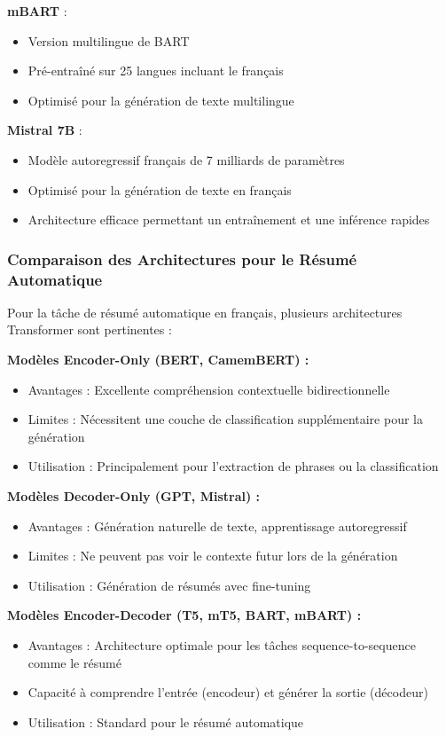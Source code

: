 \textbf{mBART} :
\begin{itemize}
    \item Version multilingue de BART
    \item Pré-entraîné sur 25 langues incluant le français
    \item Optimisé pour la génération de texte multilingue
\end{itemize}

\textbf{Mistral 7B} \cite{jiang2023mistral} :
\begin{itemize}
    \item Modèle autoregressif français de 7 milliards de paramètres
    \item Optimisé pour la génération de texte en français
    \item Architecture efficace permettant un entraînement et une inférence rapides
\end{itemize}

\subsubsection{Comparaison des Architectures pour le Résumé Automatique}

Pour la tâche de résumé automatique en français, plusieurs architectures Transformer sont pertinentes :

\textbf{Modèles Encoder-Only (BERT, CamemBERT) :}
\begin{itemize}
    \item Avantages : Excellente compréhension contextuelle bidirectionnelle
    \item Limites : Nécessitent une couche de classification supplémentaire pour la génération
    \item Utilisation : Principalement pour l'extraction de phrases ou la classification
\end{itemize}

\textbf{Modèles Decoder-Only (GPT, Mistral) :}
\begin{itemize}
    \item Avantages : Génération naturelle de texte, apprentissage autoregressif
    \item Limites : Ne peuvent pas voir le contexte futur lors de la génération
    \item Utilisation : Génération de résumés avec fine-tuning
\end{itemize}

\textbf{Modèles Encoder-Decoder (T5, mT5, BART, mBART) :}
\begin{itemize}
    \item Avantages : Architecture optimale pour les tâches sequence-to-sequence comme le résumé
    \item Capacité à comprendre l'entrée (encodeur) et générer la sortie (décodeur)
    \item Utilisation : Standard pour le résumé automatique
\end{itemize}

